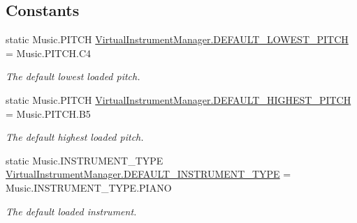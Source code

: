 \subsection*{Constants}
\begin{DoxyCompactItemize}
\item 
\mbox{\label{group___virtual_instrument_manager_ga064b6f85a7d2a4b2f552ba80c50f14db}} 
static Music.\+P\+I\+T\+CH \hyperlink{group___virtual_instrument_manager_ga064b6f85a7d2a4b2f552ba80c50f14db}{Virtual\+Instrument\+Manager.\+D\+E\+F\+A\+U\+L\+T\+\_\+\+L\+O\+W\+E\+S\+T\+\_\+\+P\+I\+T\+CH} = Music.\+P\+I\+T\+C\+H.\+C4
\begin{DoxyCompactList}\small\item\em The default lowest loaded pitch. \end{DoxyCompactList}\item 
\mbox{\label{group___virtual_instrument_manager_gafa0e722faa150594582d492e4c6c38c4}} 
static Music.\+P\+I\+T\+CH \hyperlink{group___virtual_instrument_manager_gafa0e722faa150594582d492e4c6c38c4}{Virtual\+Instrument\+Manager.\+D\+E\+F\+A\+U\+L\+T\+\_\+\+H\+I\+G\+H\+E\+S\+T\+\_\+\+P\+I\+T\+CH} = Music.\+P\+I\+T\+C\+H.\+B5
\begin{DoxyCompactList}\small\item\em The default highest loaded pitch. \end{DoxyCompactList}\item 
\mbox{\label{group___virtual_instrument_manager_ga92242f6a12951829414db205a5b3702c}} 
static Music.\+I\+N\+S\+T\+R\+U\+M\+E\+N\+T\+\_\+\+T\+Y\+PE \hyperlink{group___virtual_instrument_manager_ga92242f6a12951829414db205a5b3702c}{Virtual\+Instrument\+Manager.\+D\+E\+F\+A\+U\+L\+T\+\_\+\+I\+N\+S\+T\+R\+U\+M\+E\+N\+T\+\_\+\+T\+Y\+PE} = Music.\+I\+N\+S\+T\+R\+U\+M\+E\+N\+T\+\_\+\+T\+Y\+P\+E.\+P\+I\+A\+NO
\begin{DoxyCompactList}\small\item\em The default loaded instrument. \end{DoxyCompactList}\end{DoxyCompactItemize}


